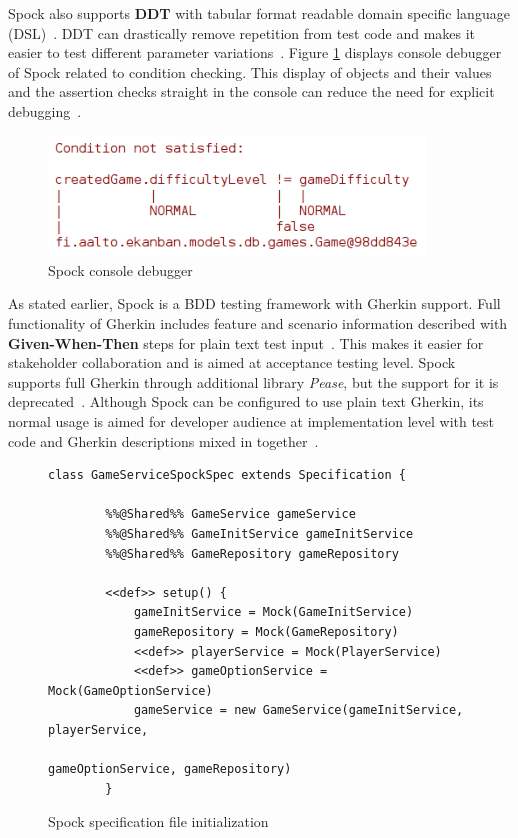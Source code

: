     Spock also supports \textbf{DDT} with tabular format readable
    domain specific language (DSL)~\cite{spock}.
    DDT can drastically remove repetition from test code and makes it easier to test different parameter
    variations~\cite{kapelonis2016java}.
    Figure \ref{fig:spock-debug} displays console debugger of Spock related to
    condition checking. This display of objects and their values and the assertion checks straight in the console
    can reduce the need for explicit debugging~\cite{kapelonis2016java}.
    \begin{figure}[ht]
      \begin{center}
        \begin{topbot}[style=mdstyle]
        \includegraphics[width=10cm]{images/spock-debug.png}
        \end{topbot}
        \caption{Spock console debugger}
        \label{fig:spock-debug}
      \end{center}
    \end{figure}

    As stated earlier, Spock is a BDD testing framework with Gherkin support.
    Full functionality of Gherkin includes feature and scenario information described
    with \textbf{Given-When-Then} steps for plain text test input~\cite{gherkin}. This makes it easier for stakeholder collaboration
    and is aimed at acceptance testing level.
    Spock supports full Gherkin through additional library \textit{Pease}, but the support for it is deprecated~\cite{spock-pease}.
    Although Spock can be configured to use plain text Gherkin, its normal usage is aimed for developer audience at implementation
    level with test code and Gherkin descriptions mixed in together~\cite{okolnychyi2016study}.

    \begin{figure}[ht]
        \begin{lstlisting}[style=java]
    class GameServiceSpockSpec extends Specification {

        %%@Shared%% GameService gameService
        %%@Shared%% GameInitService gameInitService
        %%@Shared%% GameRepository gameRepository

        <<def>> setup() {
            gameInitService = Mock(GameInitService)
            gameRepository = Mock(GameRepository)
            <<def>> playerService = Mock(PlayerService)
            <<def>> gameOptionService = Mock(GameOptionService)
            gameService = new GameService(gameInitService, playerService,
                                          gameOptionService, gameRepository)
        }
        \end{lstlisting}
        \caption{Spock specification file initialization}
        \label{fig:spock-init}
    \end{figure}

